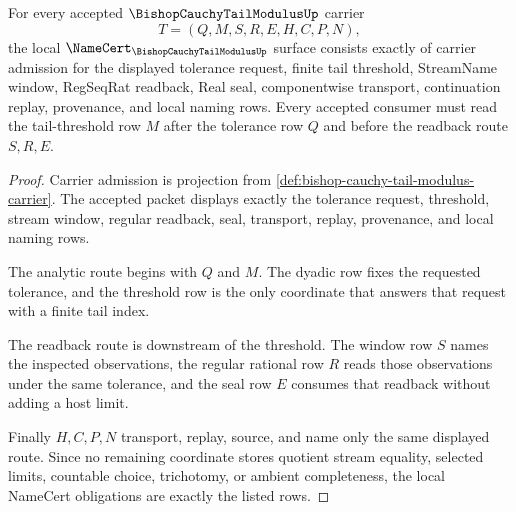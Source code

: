 \begin{theorem}
\label{thm:bishop-cauchy-tail-modulus-namecert-obligations}
For every accepted $\BishopCauchyTailModulusUp$ carrier
$$
T=(Q,M,S,R,E,H,C,P,N),
$$
the local $\NameCert_{\BishopCauchyTailModulusUp}$ surface consists exactly of carrier admission for the displayed tolerance request, finite tail threshold, StreamName window, RegSeqRat readback, Real seal, componentwise transport, continuation replay, provenance, and local naming rows. Every accepted consumer must read the tail-threshold row $M$ after the tolerance row $Q$ and before the readback route $S,R,E$.
\end{theorem}
\begin{proof}
Carrier admission is projection from \autoref{def:bishop-cauchy-tail-modulus-carrier}. The accepted packet displays exactly the tolerance request, threshold, stream window, regular readback, seal, transport, replay, provenance, and local naming rows.

The analytic route begins with $Q$ and $M$. The dyadic row fixes the requested tolerance, and the threshold row is the only coordinate that answers that request with a finite tail index.

The readback route is downstream of the threshold. The window row $S$ names the inspected observations, the regular rational row $R$ reads those observations under the same tolerance, and the seal row $E$ consumes that readback without adding a host limit.

Finally $H,C,P,N$ transport, replay, source, and name only the same displayed route. Since no remaining coordinate stores quotient stream equality, selected limits, countable choice, trichotomy, or ambient completeness, the local NameCert obligations are exactly the listed rows.
\end{proof}

